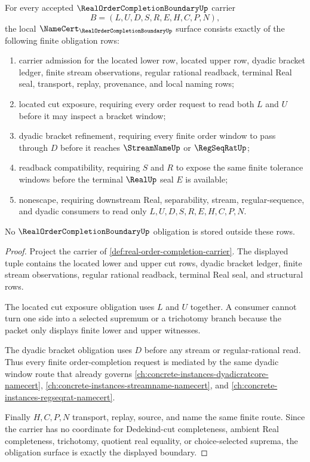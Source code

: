 \begin{theorem}
\label{thm:real-order-completion-obligations}
For every accepted $\RealOrderCompletionBoundaryUp$ carrier
$$
B=(L,U,D,S,R,E,H,C,P,N),
$$
the local $\NameCert_{\RealOrderCompletionBoundaryUp}$ surface consists exactly of the following finite obligation rows:
\begin{enumerate}
\item carrier admission for the located lower row, located upper row, dyadic bracket ledger, finite stream observations, regular rational readback, terminal Real seal, transport, replay, provenance, and local naming rows;
\item located cut exposure, requiring every order request to read both $L$ and $U$ before it may inspect a bracket window;
\item dyadic bracket refinement, requiring every finite order window to pass through $D$ before it reaches $\StreamNameUp$ or $\RegSeqRatUp$;
\item readback compatibility, requiring $S$ and $R$ to expose the same finite tolerance windows before the terminal $\RealUp$ seal $E$ is available;
\item nonescape, requiring downstream Real, separability, stream, regular-sequence, and dyadic consumers to read only $L,U,D,S,R,E,H,C,P,N$.
\end{enumerate}
No $\RealOrderCompletionBoundaryUp$ obligation is stored outside these rows.
\end{theorem}
\begin{proof}
Project the carrier of \autoref{def:real-order-completion-carrier}. The displayed tuple contains the located lower and upper cut rows, dyadic bracket ledger, finite stream observations, regular rational readback, terminal Real seal, and structural rows.

The located cut exposure obligation uses $L$ and $U$ together. A consumer cannot turn one side into a selected supremum or a trichotomy branch because the packet only displays finite lower and upper witnesses.

The dyadic bracket obligation uses $D$ before any stream or regular-rational read. Thus every finite order-completion request is mediated by the same dyadic window route that already governs \autoref{ch:concrete-instances-dyadicratcore-namecert}, \autoref{ch:concrete-instances-streamname-namecert}, and \autoref{ch:concrete-instances-regseqrat-namecert}.

Finally $H,C,P,N$ transport, replay, source, and name the same finite route. Since the carrier has no coordinate for Dedekind-cut completeness, ambient Real completeness, trichotomy, quotient real equality, or choice-selected suprema, the obligation surface is exactly the displayed boundary.
\end{proof}

